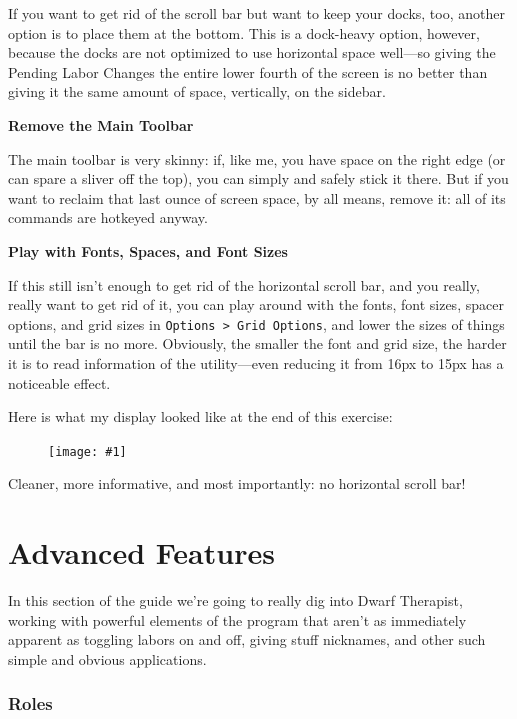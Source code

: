 \documentclass[]{article}
\newcommand{\fullfigure}[1] {
\begin{figure}[h!]
\texttt{[image: \#1]}
\end{figure}
}
\begin{document}
If you want to get rid of the scroll bar but want to keep your docks, too, another option is to place
them at the bottom. This is a dock-heavy option, however, because the docks are not optimized to use
horizontal space well---so giving the Pending Labor Changes the entire lower fourth of the screen is no
better than giving it the same amount of space, vertically, on the sidebar.
\vspace{12pt}

\noindent \textbf{Remove the Main Toolbar}

The main toolbar is very skinny: if, like me, you have space on the right edge (or can spare a sliver
off the top), you can simply and safely stick it there. But if you want to reclaim that last ounce of
screen space, by all means, remove it: all of its commands are hotkeyed anyway.
\vspace{12pt}

\noindent \textbf{Play with Fonts, Spaces, and Font Sizes}

If this still isn't enough to get rid of the horizontal scroll bar, and you really, really want to get
rid of it, you can play around with the fonts, font sizes, spacer options, and grid sizes in
\texttt{Options > Grid Options}, and lower the sizes of things until the bar is no more. Obviously, the
smaller the font and grid size, the harder it is to read information of the utility---even reducing it
from 16px to 15px has a noticeable effect.
\vspace{12pt}

Here is what my display looked like at the end of this exercise:
\fullfigure{Sec2Fig28}

Cleaner, more informative, and most importantly: no horizontal scroll bar!

\newpage
\part{Advanced Features}
\label{sec:Advanced Features}

In this section of the guide we're going to really dig into Dwarf Therapist, working with powerful
elements of the program that aren't as immediately apparent as toggling labors on and off, giving stuff
nicknames, and other such simple and obvious applications.

\section{Roles}
\label{sec:Roles}
\end{document}
